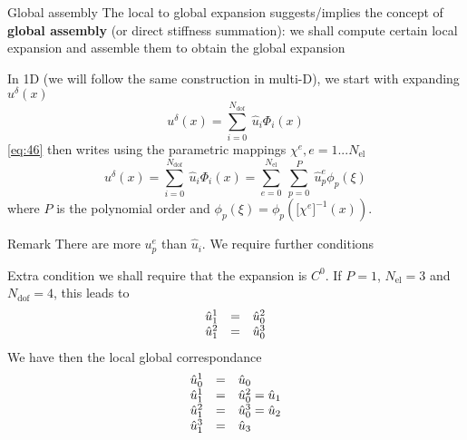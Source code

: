 \begin{frame}{Global assembly}
  The local to global expansion suggests/implies the concept of \textbf{global
    assembly} (or direct stiffness summation): we shall compute
  certain local expansion and assemble them to obtain the global expansion

  In 1D (we will follow the same construction in multi-D), we start with expanding $u^\delta(x)$
  \begin{equation}
    \label{eq:46}
    u^\delta(x) = \sum_{i=0}^{N_\text{dof}}\ \hat{u}_i \Phi_i(x)
  \end{equation}
  \eqref{eq:46} then writes using the parametric mappings $\chi^e, e=1...N_{\text{el}}$
  \begin{equation}
    \label{eq:45}
    u^\delta(x) = \sum_{i=0}^{N_\text{dof}}\ \hat{u}_i \Phi_i(x) = \sum_{e=0}^{N_\text{el}}\ \sum_{p=0}^{P}\ \hat{u}^e_p \phi_p(\xi)
  \end{equation}
  where $P$ is the polynomial order and $\phi_p(\xi) = \phi_p( \Big[ \chi^e\Big]^{-1} (x) )$.

  \begin{block}{Remark}
    There are more $u^e_p$ than $\hat{u}_i$. We require further conditions
  \end{block}
\end{frame}

\begin{frame}{Extra condition}
  we shall require that the expansion is $C^0$. If $P=1$, $N_{\text{el}} = 3$ and $N_{\text{dof}} = 4$, this leads to
  \begin{equation}
    \label{eq:47}
    \begin{array}[c]{rcl}
      \hat{u}^1_1 &=& \hat{u}^2_0 \\
      \hat{u}^2_1 &=& \hat{u}^3_0
    \end{array}
  \end{equation}
  We have  then the local global correspondance
  \begin{equation}
    \label{eq:48}
    \begin{array}[c]{rcl}
      \hat{u}^1_0 &=& \hat{u}_0 \\
      \hat{u}^1_1 &=& \hat{u}^2_0 = \hat{u}_1\\
      \hat{u}^2_1 &=& \hat{u}^3_0  = \hat{u}_2\\
      \hat{u}^3_1 &=& \hat{u}_3 \\
    \end{array}
  \end{equation}
\end{frame}


